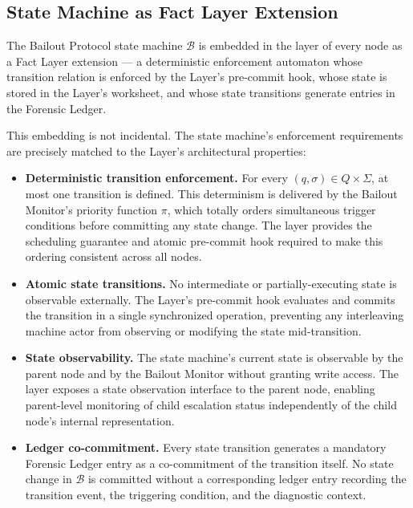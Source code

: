 \subsection{State Machine as Fact Layer Extension}
\label{sec:state-machine-fact-layer}

The Bailout Protocol state machine $\mathcal{B}$ is embedded in the \fact{} layer of every \bxthree{} node as a Fact Layer extension — a deterministic enforcement automaton whose transition relation is enforced by the \fact{} Layer's pre-commit hook, whose state is stored in the \fact{} Layer's worksheet, and whose state transitions generate entries in the Forensic Ledger.

This embedding is not incidental. The state machine's enforcement requirements are precisely matched to the \fact{} Layer's architectural properties:

\begin{itemize}\itemsep=0pt
\item[(\textit{i})] \textbf{Deterministic transition enforcement.} For every $(q, \sigma) \in Q \times \Sigma$, at most one transition is defined. This determinism is delivered by the Bailout Monitor's priority function $\pi$, which totally orders simultaneous trigger conditions before committing any state change. The \fact{} layer provides the scheduling guarantee and atomic pre-commit hook required to make this ordering consistent across all nodes.

\item[(\textit{ii})] \textbf{Atomic state transitions.} No intermediate or partially-executing state is observable externally. The \fact{} Layer's pre-commit hook evaluates and commits the transition in a single synchronized operation, preventing any interleaving machine actor from observing or modifying the state mid-transition.

\item[(\textit{iii})] \textbf{State observability.} The state machine's current state is observable by the parent node and by the Bailout Monitor without granting write access. The \fact{} layer exposes a state observation interface to the parent node, enabling parent-level monitoring of child escalation status independently of the child node's internal representation.

\item[(\textit{iv})] \textbf{Ledger co-commitment.} Every state transition generates a mandatory Forensic Ledger entry as a co-commitment of the transition itself. No state change in $\mathcal{B}$ is committed without a corresponding ledger entry recording the transition event, the triggering condition, and the diagnostic context.
\end{itemize}

